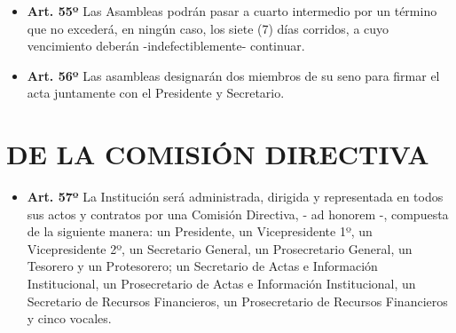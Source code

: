 \documentclass[]{book}
\providecommand{\tightlist}{%
  \setlength{\itemsep}{0pt}\setlength{\parskip}{0pt}}
\begin{document}
\begin{itemize}
\tightlist
\item
  \textbf{Art. 55º}
  Las Asambleas podrán pasar a cuarto intermedio por un término que no excederá, en ningún caso, los siete (7) días corridos, a cuyo vencimiento deberán -indefectiblemente- continuar.
\end{itemize}

\begin{itemize}
\tightlist
\item
  \textbf{Art. 56º}
  Las asambleas designarán dos miembros de su seno para firmar el acta juntamente con el Presidente y Secretario.
\end{itemize}

\hypertarget{cap7}{%
\chapter{DE LA COMISIÓN DIRECTIVA}\label{cap7}}

\begin{itemize}
\tightlist
\item
  \textbf{Art. 57º}
  La Institución será administrada, dirigida y representada en todos sus actos y contratos por una Comisión Directiva, - ad honorem -, compuesta de la siguiente manera: un Presidente, un Vicepresidente 1º, un Vicepresidente 2º, un Secretario General, un Prosecretario General, un Tesorero y un Protesorero; un Secretario de Actas e Información Institucional, un Prosecretario de Actas e Información Institucional, un Secretario de Recursos Financieros, un Prosecretario de Recursos Financieros y cinco vocales.
\end{itemize}
\end{document}
